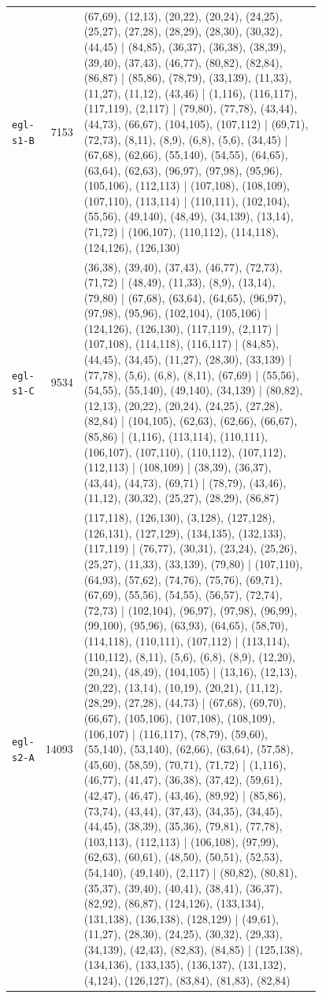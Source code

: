 \begin{landscape}
\begin{longtable}{lr>{\tiny\raggedright\arraybackslash}p{0.78\linewidth}}
\texttt{egl-s1-B} & 7153 & (67,69), (12,13), (20,22), (20,24), (24,25), (25,27), (27,28), (28,29), (28,30), (30,32), (44,45) | (84,85), (36,37), (36,38), (38,39), (39,40), (37,43), (46,77), (80,82), (82,84), (86,87) | (85,86), (78,79), (33,139), (11,33), (11,27), (11,12), (43,46) | (1,116), (116,117), (117,119), (2,117) | (79,80), (77,78), (43,44), (44,73), (66,67), (104,105), (107,112) | (69,71), (72,73), (8,11), (8,9), (6,8), (5,6), (34,45) | (67,68), (62,66), (55,140), (54,55), (64,65), (63,64), (62,63), (96,97), (97,98), (95,96), (105,106), (112,113) | (107,108), (108,109), (107,110), (113,114) | (110,111), (102,104), (55,56), (49,140), (48,49), (34,139), (13,14), (71,72) | (106,107), (110,112), (114,118), (124,126), (126,130) \\[2pt]
\texttt{egl-s1-C} & 9534 & (36,38), (39,40), (37,43), (46,77), (72,73), (71,72) | (48,49), (11,33), (8,9), (13,14), (79,80) | (67,68), (63,64), (64,65), (96,97), (97,98), (95,96), (102,104), (105,106) | (124,126), (126,130), (117,119), (2,117) | (107,108), (114,118), (116,117) | (84,85), (44,45), (34,45), (11,27), (28,30), (33,139) | (77,78), (5,6), (6,8), (8,11), (67,69) | (55,56), (54,55), (55,140), (49,140), (34,139) | (80,82), (12,13), (20,22), (20,24), (24,25), (27,28), (82,84) | (104,105), (62,63), (62,66), (66,67), (85,86) | (1,116), (113,114), (110,111), (106,107), (107,110), (110,112), (107,112), (112,113) | (108,109) | (38,39), (36,37), (43,44), (44,73), (69,71) | (78,79), (43,46), (11,12), (30,32), (25,27), (28,29), (86,87) \\[2pt]
\texttt{egl-s2-A} & 14093 & (117,118), (126,130), (3,128), (127,128), (126,131), (127,129), (134,135), (132,133), (117,119) | (76,77), (30,31), (23,24), (25,26), (25,27), (11,33), (33,139), (79,80) | (107,110), (64,93), (57,62), (74,76), (75,76), (69,71), (67,69), (55,56), (54,55), (56,57), (72,74), (72,73) | (102,104), (96,97), (97,98), (96,99), (99,100), (95,96), (63,93), (64,65), (58,70), (114,118), (110,111), (107,112) | (113,114), (110,112), (8,11), (5,6), (6,8), (8,9), (12,20), (20,24), (48,49), (104,105) | (13,16), (12,13), (20,22), (13,14), (10,19), (20,21), (11,12), (28,29), (27,28), (44,73) | (67,68), (69,70), (66,67), (105,106), (107,108), (108,109), (106,107) | (116,117), (78,79), (59,60), (55,140), (53,140), (62,66), (63,64), (57,58), (45,60), (58,59), (70,71), (71,72) | (1,116), (46,77), (41,47), (36,38), (37,42), (59,61), (42,47), (46,47), (43,46), (89,92) | (85,86), (73,74), (43,44), (37,43), (34,35), (34,45), (44,45), (38,39), (35,36), (79,81), (77,78), (103,113), (112,113) | (106,108), (97,99), (62,63), (60,61), (48,50), (50,51), (52,53), (54,140), (49,140), (2,117) | (80,82), (80,81), (35,37), (39,40), (40,41), (38,41), (36,37), (82,92), (86,87), (124,126), (133,134), (131,138), (136,138), (128,129) | (49,61), (11,27), (28,30), (24,25), (30,32), (29,33), (34,139), (42,43), (82,83), (84,85) | (125,138), (134,136), (133,135), (136,137), (131,132), (4,124), (126,127), (83,84), (81,83), (82,84) \\[2pt]

\end{longtable}
\end{landscape}
